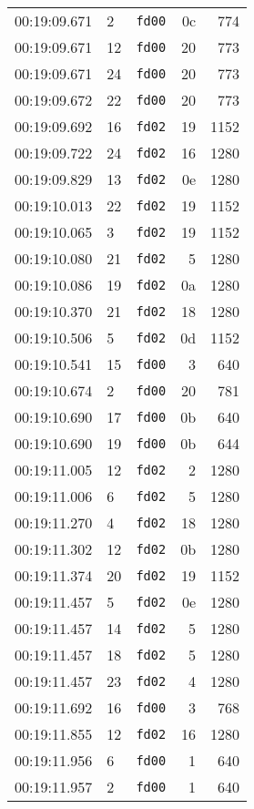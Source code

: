 \documentclass{article}
\begin{document}
\begin{longtable}{lllrr}
00:19:09.671 & 2 & \texttt{fd00} & 0c & 774 \\
00:19:09.671 & 12 & \texttt{fd00} & 20 & 773 \\
00:19:09.671 & 24 & \texttt{fd00} & 20 & 773 \\
00:19:09.672 & 22 & \texttt{fd00} & 20 & 773 \\
00:19:09.692 & 16 & \texttt{fd02} & 19 & 1152 \\
00:19:09.722 & 24 & \texttt{fd02} & 16 & 1280 \\
00:19:09.829 & 13 & \texttt{fd02} & 0e & 1280 \\
00:19:10.013 & 22 & \texttt{fd02} & 19 & 1152 \\
00:19:10.065 & 3 & \texttt{fd02} & 19 & 1152 \\
00:19:10.080 & 21 & \texttt{fd02} & 5 & 1280 \\
00:19:10.086 & 19 & \texttt{fd02} & 0a & 1280 \\
00:19:10.370 & 21 & \texttt{fd02} & 18 & 1280 \\
00:19:10.506 & 5 & \texttt{fd02} & 0d & 1152 \\
00:19:10.541 & 15 & \texttt{fd00} & 3 & 640 \\
00:19:10.674 & 2 & \texttt{fd00} & 20 & 781 \\
00:19:10.690 & 17 & \texttt{fd00} & 0b & 640 \\
00:19:10.690 & 19 & \texttt{fd00} & 0b & 644 \\
00:19:11.005 & 12 & \texttt{fd02} & 2 & 1280 \\
00:19:11.006 & 6 & \texttt{fd02} & 5 & 1280 \\
00:19:11.270 & 4 & \texttt{fd02} & 18 & 1280 \\
00:19:11.302 & 12 & \texttt{fd02} & 0b & 1280 \\
00:19:11.374 & 20 & \texttt{fd02} & 19 & 1152 \\
00:19:11.457 & 5 & \texttt{fd02} & 0e & 1280 \\
00:19:11.457 & 14 & \texttt{fd02} & 5 & 1280 \\
00:19:11.457 & 18 & \texttt{fd02} & 5 & 1280 \\
00:19:11.457 & 23 & \texttt{fd02} & 4 & 1280 \\
00:19:11.692 & 16 & \texttt{fd00} & 3 & 768 \\
00:19:11.855 & 12 & \texttt{fd02} & 16 & 1280 \\
00:19:11.956 & 6 & \texttt{fd00} & 1 & 640 \\
00:19:11.957 & 2 & \texttt{fd00} & 1 & 640 \\

\end{longtable}
\end{document}
